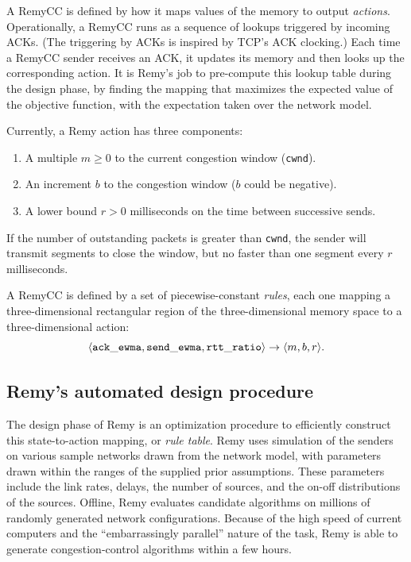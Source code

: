 A RemyCC is defined by how it maps values of the memory to output
\emph{actions}. Operationally, a RemyCC runs as a sequence of lookups
triggered by incoming ACKs. (The triggering by ACKs is
inspired by TCP's ACK clocking.)  Each time a RemyCC sender receives
an ACK, it updates its memory and then looks up the corresponding
action. It is Remy's job to pre-compute this lookup table during the design
phase, by finding the mapping that maximizes the expected value of the
objective function, with the expectation taken over the network model.

Currently, a Remy action has three components:

\begin{enumerate}

\item A multiple $m \geq 0$ to the current congestion window ({\tt cwnd}).

\item An increment $b$ to the congestion window ($b$ could be negative).

\item A lower bound $r > 0$ milliseconds on the time between
  successive sends.

\end{enumerate}

If the number of outstanding packets is greater than {\tt cwnd}, the
sender will transmit segments to close the window, but no faster than
one segment every $r$ milliseconds.

A RemyCC is defined by a set of piecewise-constant \emph{rules}, each one
mapping a three-dimensional rectangular region of the
three-dimensional memory space to a three-dimensional action:
$$
\langle {\tt ack\_ewma}, {\tt send\_ewma}, {\tt rtt\_ratio} \rangle \rightarrow
\langle m, b, r \rangle.
$$

\subsection{Remy's automated design procedure}

The design phase of Remy is an optimization procedure to efficiently
construct this state-to-action mapping, or \emph{rule table}.  Remy uses simulation of the senders on
various sample networks drawn from the network model, with
parameters drawn within the ranges of the supplied prior
assumptions. These parameters include the link rates, delays, the
number of sources, and the on-off distributions of the
sources. Offline, Remy
evaluates candidate algorithms on
millions of randomly generated network configurations. Because of the
high speed of current computers and the ``embarrassingly parallel''
nature of the task, Remy is able to generate congestion-control
algorithms within a few hours.

